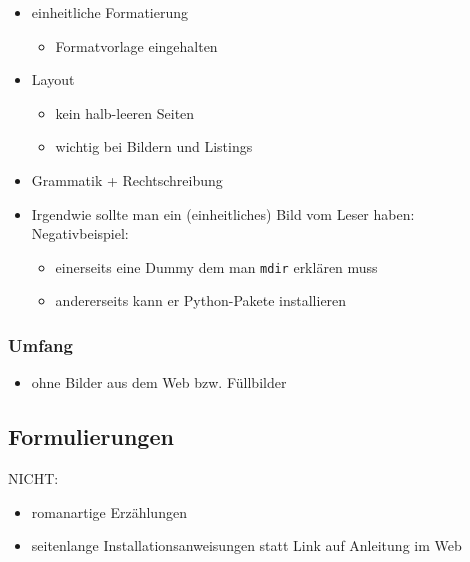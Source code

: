 \begin{itemize}
\item
  einheitliche Formatierung

  \begin{itemize}
  \tightlist
  \item
    Formatvorlage eingehalten
  \end{itemize}
\item
  Layout

  \begin{itemize}
  \tightlist
  \item
    kein halb-leeren Seiten
  \item
    wichtig bei Bildern und Listings
  \end{itemize}
\item
  Grammatik + Rechtschreibung
\item
  Irgendwie sollte man ein (einheitliches) Bild vom Leser haben:\newline
  Negativbeispiel:

  \begin{itemize}
  \tightlist
  \item
    einerseits eine Dummy dem man \passthrough{\lstinline!mdir!}
    erklären muss
  \item
    andererseits kann er Python-Pakete installieren
  \end{itemize}
\end{itemize}

\hypertarget{umfang}{%
\subsubsection{Umfang}\label{umfang}}

\begin{itemize}
\tightlist
\item
  ohne Bilder aus dem Web bzw. Füllbilder
\end{itemize}

\hypertarget{formulierungen}{%
\subsection{Formulierungen}\label{formulierungen}}

NICHT:

\begin{itemize}
\tightlist
\item
  romanartige Erzählungen
\item
  seitenlange Installationsanweisungen statt Link auf Anleitung im Web
\end{itemize}

